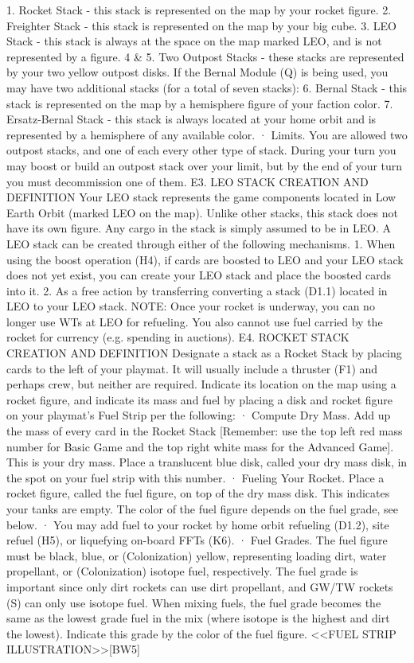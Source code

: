 \documentclass[a4paper]{book}
\begin{document}
1.  Rocket Stack - this stack is represented on the map by your rocket figure.
2.  Freighter Stack - this stack is represented on the map by your big cube.
3.  LEO Stack - this stack is always at the space on the map marked LEO, and is not represented by a figure.
4 \& 5.  Two Outpost Stacks - these stacks are represented by your two yellow outpost disks.
If the Bernal Module (Q) is being used, you may have two additional stacks (for a total of seven stacks):
6.  Bernal Stack - this stack is represented on the map by a hemisphere figure of your faction color.
7.  Ersatz-Bernal Stack - this stack is always located at your home orbit and is represented by a hemisphere of any available color.
·   	Limits. You are allowed two outpost stacks, and one of each every other type of stack. During your turn you may boost or build an outpost stack over your limit, but by the end of your turn you must decommission one of them.
E3. LEO STACK CREATION AND DEFINITION
Your LEO stack represents the game components located in Low Earth Orbit (marked LEO on the map). Unlike other stacks, this stack does not have its own figure. Any cargo in the stack is simply assumed to be in LEO. A LEO stack can be created through either of the following mechanisms.
1.  When using the boost operation (H4), if cards are boosted to LEO and your LEO stack does not yet exist, you can create your LEO stack and place the boosted cards into it.
2.  As a free action by transferring converting a stack (D1.1) located in LEO to your LEO stack.
NOTE: Once your rocket is underway, you can no longer use WTs at LEO for refueling. You also cannot use fuel carried by the rocket for currency (e.g. spending in auctions).
E4. ROCKET STACK CREATION AND DEFINITION
Designate a stack as a Rocket Stack by placing cards to the left of your playmat. It will usually include a thruster (F1) and perhaps crew, but neither are required. Indicate its location on the map using a rocket figure, and indicate its mass and fuel by placing a disk and rocket figure on your playmat’s Fuel Strip per the following:
·  Compute Dry Mass. Add up the mass of every card in the Rocket Stack [Remember: use the top left red mass number for Basic Game and the top right white mass for the Advanced Game]. This is your dry mass. Place a translucent blue disk, called your dry mass disk, in the spot on your fuel strip with this number.
·  Fueling Your Rocket. Place a rocket figure, called the fuel figure, on top of the dry mass disk. This indicates your tanks are empty. The color of the fuel figure depends on the fuel grade, see below.
·  You may add fuel to your rocket by home orbit refueling (D1.2), site refuel (H5), or liquefying on-board FFTs (K6).
·  Fuel Grades. The fuel figure must be black, blue, or (Colonization) yellow, representing loading dirt, water propellant, or (Colonization) isotope fuel, respectively. The fuel grade is important since only dirt rockets can use dirt propellant, and GW/TW rockets (S) can only use isotope fuel. When mixing fuels, the fuel grade becomes the same as the lowest grade fuel in the mix (where isotope is the highest and dirt the lowest). Indicate this grade by the color of the fuel figure.
<<FUEL STRIP ILLUSTRATION>>[BW5] 
\end{document}
